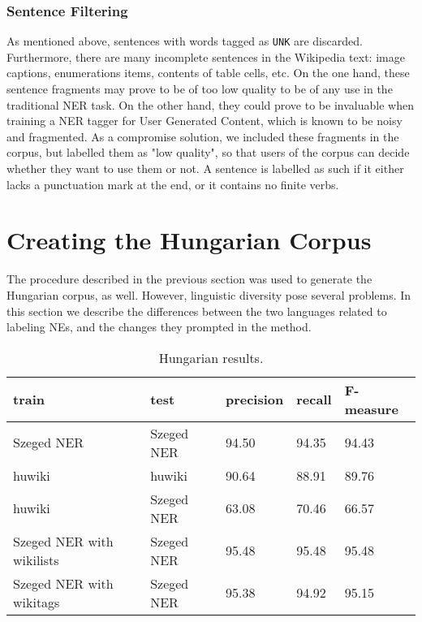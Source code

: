 \documentclass[11pt]{article}
\begin{document}
\subsubsection{Sentence Filtering}

As mentioned above, sentences with words tagged as \texttt{UNK} are discarded. Furthermore, there are many incomplete sentences in the Wikipedia text: image captions, enumerations items, contents of table cells, etc. On the one hand, these sentence fragments may prove to be of too low quality to be of any use in the traditional NER task. On the other hand, they could prove to be invaluable when training a NER tagger for User Generated Content, which is known to be noisy and fragmented. As a compromise solution, we included these fragments in the corpus, but labelled them as "low quality", so that users of the corpus can decide whether they want to use them or not. A sentence is labelled as such if it either lacks a punctuation mark at the end, or it contains no finite verbs.

\section{Creating the Hungarian Corpus}
\label{sec:hun}

The procedure described in the previous section was used to generate the Hungarian corpus, as well. However, linguistic diversity pose several problems. In this section we describe the differences between the two languages related to labeling NEs, and the changes they prompted in the method.

\begin{table*}[ht]
\begin{center}
\begin{tabular}{lllll}
\hline \bf train & \bf test & \bf precision & \bf recall & \bf F-measure \\ \hline
Szeged NER & Szeged NER & 94.50 & 94.35 & 94.43 \\
huwiki & huwiki & 90.64 & 88.91 &  89.76 \\
huwiki & Szeged NER & 63.08 & 70.46 & 66.57 \\
Szeged NER with wikilists & Szeged NER & 95.48 & 95.48 & 95.48 \\
Szeged NER with wikitags & Szeged NER & 95.38 & 94.92 & 95.15 \\
\hline
\end{tabular}
\end{center}
\caption{\label{huresults} Hungarian results.}
\end{table*}
\end{document}
